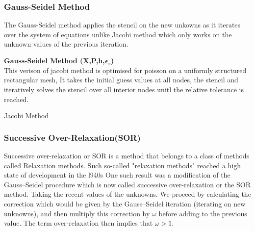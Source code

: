 \subsubsection{Gauss-Seidel Method}
The Gauss-Seidel method applies the stencil on the new unkowns as it iterates over the system of equations unlike Jacobi method which only works on the unknown values of the previous iteration.\\[2mm]
\begin{algorithm}[H]
    \textbf{Gauss-Seidel Method (X,P,h,$\mathbf{\epsilon_r}$)}\\[-1pt]
    This verison of jacobi method is optimised for poisson on a uniformly structured rectangular mesh, It takes the initial guess values at all nodes, the stencil and iteratively solves the stencil over all interior nodes unitl the relative tolerance is reached.  \\[2mm]
    \caption{Jacobi Method}
\end{algorithm}


\subsubsection{Successive Over-Relaxation(SOR)}
Successive over-relaxation or SOR is a method that belongs to a class of methods called Relaxation methods. 
Such so-called "relaxation methods" reached a high state of development in the l940s One such result was a modiﬁcation of the Gauss–Seidel procedure which is now called successive over-relaxation or the SOR method.
Taking the recent values of the unknowns. We proceed by calculating the correction which would be given by the Gauss–Seidel iteration (iterating on new unknowns), and then multiply this correction by $\omega$ before adding to the previous value. The term over-relaxation then implies that $\omega>1$. \\[2mm]


